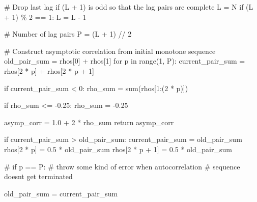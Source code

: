 \documentclass[
  letterpaper,
  DIV=11,
  numbers=noendperiod]{scrartcl}
\newenvironment{Shaded}{\begin{snugshade}}{\end{snugshade}}
\newcommand{\BuiltInTok}[1]{\textcolor[rgb]{0.00,0.23,0.31}{#1}}
\newcommand{\CommentTok}[1]{\textcolor[rgb]{0.37,0.37,0.37}{#1}}
\newcommand{\ControlFlowTok}[1]{\textcolor[rgb]{0.00,0.23,0.31}{#1}}
\newcommand{\DecValTok}[1]{\textcolor[rgb]{0.68,0.00,0.00}{#1}}
\newcommand{\FloatTok}[1]{\textcolor[rgb]{0.68,0.00,0.00}{#1}}
\newcommand{\KeywordTok}[1]{\textcolor[rgb]{0.00,0.23,0.31}{#1}}
\newcommand{\NormalTok}[1]{\textcolor[rgb]{0.00,0.23,0.31}{#1}}
\newcommand{\OperatorTok}[1]{\textcolor[rgb]{0.37,0.37,0.37}{#1}}
\begin{document}
\begin{Shaded}
\begin{Highlighting}[]
  \CommentTok{\# Drop last lag if (L + 1) is odd so that the lag pairs are complete}
\NormalTok{  L }\OperatorTok{=}\NormalTok{ N}
  \ControlFlowTok{if}\NormalTok{ (L }\OperatorTok{+} \DecValTok{1}\NormalTok{) }\OperatorTok{\%} \DecValTok{2} \OperatorTok{==} \DecValTok{1}\NormalTok{:}
\NormalTok{    L }\OperatorTok{=}\NormalTok{ L }\OperatorTok{{-}} \DecValTok{1}
  
  \CommentTok{\# Number of lag pairs}
\NormalTok{  P }\OperatorTok{=}\NormalTok{ (L }\OperatorTok{+} \DecValTok{1}\NormalTok{) }\OperatorTok{//} \DecValTok{2}
  
  \CommentTok{\# Construct asymptotic correlation from initial monotone sequence}
\NormalTok{  old\_pair\_sum }\OperatorTok{=}\NormalTok{ rhos[}\DecValTok{0}\NormalTok{] }\OperatorTok{+}\NormalTok{ rhos[}\DecValTok{1}\NormalTok{]}
  \ControlFlowTok{for}\NormalTok{ p }\KeywordTok{in} \BuiltInTok{range}\NormalTok{(}\DecValTok{1}\NormalTok{, P):}
\NormalTok{    current\_pair\_sum }\OperatorTok{=}\NormalTok{ rhos[}\DecValTok{2} \OperatorTok{*}\NormalTok{ p] }\OperatorTok{+}\NormalTok{ rhos[}\DecValTok{2} \OperatorTok{*}\NormalTok{ p }\OperatorTok{+} \DecValTok{1}\NormalTok{]}
    
    \ControlFlowTok{if}\NormalTok{ current\_pair\_sum }\OperatorTok{\textless{}} \DecValTok{0}\NormalTok{:}
\NormalTok{      rho\_sum }\OperatorTok{=} \BuiltInTok{sum}\NormalTok{(rhos[}\DecValTok{1}\NormalTok{:(}\DecValTok{2} \OperatorTok{*}\NormalTok{ p)])}
      
      \ControlFlowTok{if}\NormalTok{ rho\_sum }\OperatorTok{\textless{}=} \OperatorTok{{-}}\FloatTok{0.25}\NormalTok{:}
\NormalTok{        rho\_sum }\OperatorTok{=} \OperatorTok{{-}}\FloatTok{0.25}
      
\NormalTok{      asymp\_corr }\OperatorTok{=} \FloatTok{1.0} \OperatorTok{+} \DecValTok{2} \OperatorTok{*}\NormalTok{ rho\_sum}
      \ControlFlowTok{return}\NormalTok{ asymp\_corr}
    
    \ControlFlowTok{if}\NormalTok{ current\_pair\_sum }\OperatorTok{\textgreater{}}\NormalTok{ old\_pair\_sum:}
\NormalTok{      current\_pair\_sum }\OperatorTok{=}\NormalTok{ old\_pair\_sum}
\NormalTok{      rhos[}\DecValTok{2} \OperatorTok{*}\NormalTok{ p]     }\OperatorTok{=} \FloatTok{0.5} \OperatorTok{*}\NormalTok{ old\_pair\_sum}
\NormalTok{      rhos[}\DecValTok{2} \OperatorTok{*}\NormalTok{ p }\OperatorTok{+} \DecValTok{1}\NormalTok{] }\OperatorTok{=} \FloatTok{0.5} \OperatorTok{*}\NormalTok{ old\_pair\_sum}

    \CommentTok{\# if p == P:}
      \CommentTok{\# throw some kind of error when autocorrelation}
      \CommentTok{\# sequence doesn\textquotesingle{}t get terminated}
    
\NormalTok{    old\_pair\_sum }\OperatorTok{=}\NormalTok{ current\_pair\_sum}

\end{Highlighting}
\end{Shaded}
\end{document}
